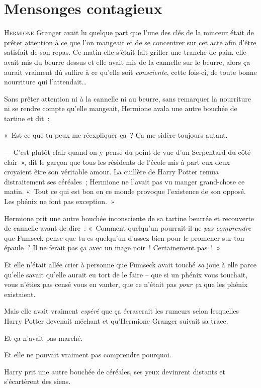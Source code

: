 \chapter{Mensonges contagieux}

\lettrine{H}{ermione} Granger avait lu quelque part que l'une des clés de la minceur était de prêter attention à ce que l'on mangeait et de se concentrer sur cet acte afin d'être satisfait de son repas.
Ce matin elle s'était fait griller une tranche de pain, elle avait mis du beurre dessus et elle avait mis de la cannelle sur le beurre, alors ça aurait vraiment dû suffire à ce qu'elle soit \emph{consciente}, cette fois-ci, de toute bonne nourriture qui l'attendait…

Sans prêter attention ni à la cannelle ni au beurre, sans remarquer la nourriture ni se rendre compte qu'elle mangeait, Hermione avala une autre bouchée de tartine et dit~:

«~Est-ce que tu peux me réexpliquer ça~?
Ça me sidère toujours autant.

--- C'est plutôt clair quand on y pense du point de vue d'un Serpentard du côté clair~», dit le garçon que tous les résidents de l'école mis à part eux deux croyaient être son véritable amour.
La cuillère de Harry Potter remua distraitement ses céréales~; Hermione ne l'avait pas vu manger grand-chose ce matin.
«~Tout ce qui est bon en ce monde provoque l'existence de son opposé.
Les phénix ne font pas exception.~»

Hermione prit une autre bouchée inconsciente de sa tartine beurrée et recouverte de cannelle avant de dire~: «~Comment quelqu'un pourrait-il ne \emph{pas comprendre} que Fumseck pense que tu es quelqu'un d'assez bien pour le promener sur ton épaule~?
Il ne ferait pas ça avec un mage noir~!
Certainement pas~!~»

Et elle n'était allée crier à personne que Fumseck avait touché \emph{sa} joue à elle parce qu'elle savait qu'elle aurait eu tort de le faire -- que si un phénix vous touchait, vous n'étiez pas censé vous en vanter, que ce n'était pas \emph{pour ça} que les phénix existaient.

Mais elle avait vraiment \emph{espéré} que ça écraserait les rumeurs selon lesquelles Harry Potter devenait méchant et qu'Hermione Granger suivait sa trace.

Et ça n'avait pas marché.

Et elle ne pouvait vraiment pas comprendre pourquoi.

Harry prit une autre bouchée de céréales, ses yeux devinrent distants et s'écartèrent des siens.

